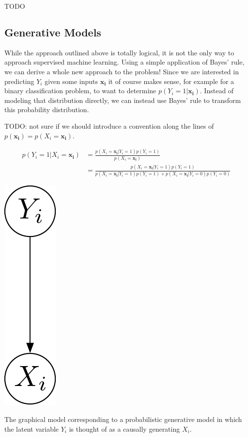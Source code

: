 \documentclass[assignment02_Solutions]{subfiles}
\begin{document}
\begin{understandingcheck}
TODO
\end{understandingcheck}

\subsection{Generative Models}
While the approach outlined above is totally logical, it is not the only way to approach supervised machine learning.  Using a simple application of Bayes' rule, we can derive a whole new approach to the problem!  Since we are interested in predicting $Y_i$ given some inputs $\mathbf{x_i}$ it of course makes sense, for example for a binary classification problem, to want to determine $p(Y_i = 1 | \mathbf{x_i})$.  Instead of modeling that distribution directly, we can instead use Bayes' rule to transform this probability distribution.

TODO: not sure if we should introduce a convention along the lines of $p(\mathbf{x_i}) = p(X_i = \mathbf{x_i})$.

\begin{align}
p(Y_i  = 1 | X_i = \mathbf{x_i}) &= \frac{p(X_i = \mathbf{x_i} | Y_i = 1) p(Y_i = 1)}{p(X_i = \mathbf{x_i})} \label{eq:pgm} \\
&= \frac{p(X_i = \mathbf{x_i} | Y_i = 1) p(Y_i = 1)}{p(X_i =  \mathbf{x_i} | Y_i = 1) p(Y_i = 1) + p(X_i = \mathbf{x_i} | Y_i = 0) p(Y_i = 0)} \nonumber
\end{align}

\begin{marginfigure}
\begin{center}
\includegraphics[width=0.2\linewidth]{figures/pgm}
\end{center}
\caption{The graphical model corresponding to a probabilistic generative model in which the latent variable $Y_i$ is thought of as a causally generating $X_i$.\label{fig:pgm}}
\end{marginfigure}
\end{document}
